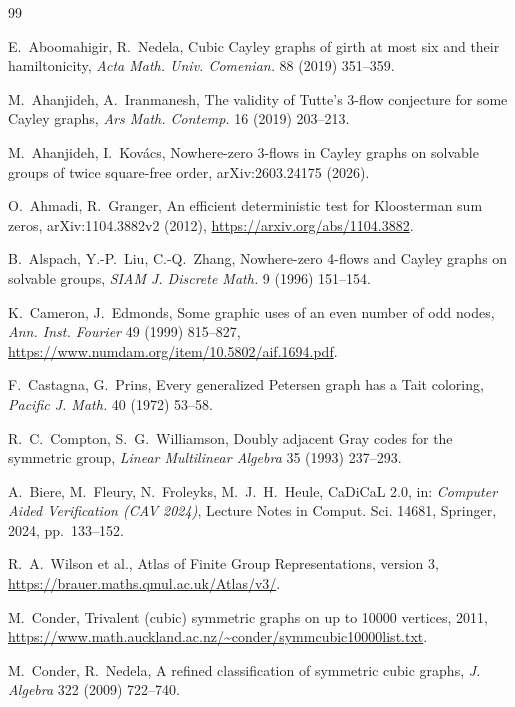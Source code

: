 \documentclass[11pt,a4paper]{article}
\theoremstyle{definition}
\theoremstyle{remark}
\begin{document}
\begin{thebibliography}{99}

 E.~Aboomahigir, R.~Nedela, Cubic Cayley graphs of girth at most six and their hamiltonicity, \emph{Acta Math. Univ. Comenian.} 88 (2019) 351--359.

 M.~Ahanjideh, A.~Iranmanesh, The validity of Tutte's 3-flow conjecture for some Cayley graphs, \emph{Ars Math. Contemp.} 16 (2019) 203--213.

 M.~Ahanjideh, I.~Kov\'acs, Nowhere-zero 3-flows in Cayley graphs on solvable groups of twice square-free order, arXiv:2603.24175 (2026).

 O.~Ahmadi, R.~Granger, An efficient deterministic test for Kloosterman sum zeros, arXiv:1104.3882v2 (2012), \url{https://arxiv.org/abs/1104.3882}.

 B.~Alspach, Y.-P.~Liu, C.-Q.~Zhang, Nowhere-zero 4-flows and Cayley graphs on solvable groups, \emph{SIAM J. Discrete Math.} 9 (1996) 151--154.

 K.~Cameron, J.~Edmonds, Some graphic uses of an even number of odd nodes, \emph{Ann. Inst. Fourier} 49 (1999) 815--827, \url{https://www.numdam.org/item/10.5802/aif.1694.pdf}.

 F.~Castagna, G.~Prins, Every generalized Petersen graph has a Tait coloring, \emph{Pacific J. Math.} 40 (1972) 53--58.

 R.~C.~Compton, S.~G.~Williamson, Doubly adjacent Gray codes for the symmetric group, \emph{Linear Multilinear Algebra} 35 (1993) 237--293.

 A.~Biere, M.~Fleury, N.~Froleyks, M.~J.~H.~Heule, CaDiCaL 2.0, in: \emph{Computer Aided Verification (CAV 2024)}, Lecture Notes in Comput. Sci. 14681, Springer, 2024, pp.~133--152.

 R.~A.~Wilson et al., Atlas of Finite Group Representations, version 3, \url{https://brauer.maths.qmul.ac.uk/Atlas/v3/}.

 M.~Conder, Trivalent (cubic) symmetric graphs on up to 10000 vertices, 2011, \url{https://www.math.auckland.ac.nz/~conder/symmcubic10000list.txt}.

 M.~Conder, R.~Nedela, A refined classification of symmetric cubic graphs, \emph{J. Algebra} 322 (2009) 722--740.


\end{thebibliography}
\end{document}
